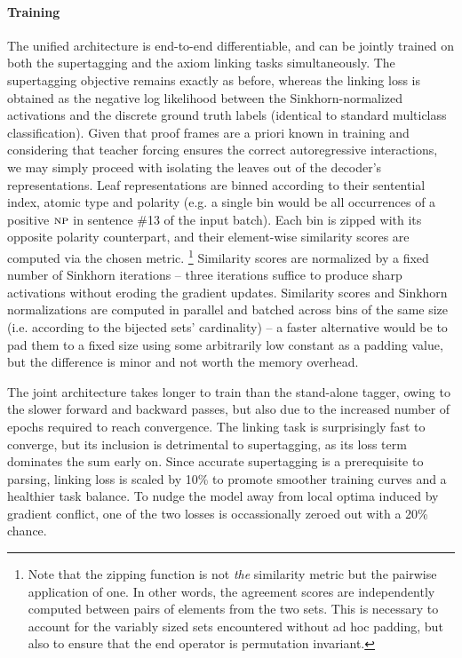 \paragraph{Training}
The unified architecture is end-to-end differentiable, and can be jointly trained on both the supertagging and the axiom linking tasks simultaneously.
The supertagging objective remains exactly as before, whereas the linking loss is obtained as the negative log likelihood between the Sinkhorn-normalized activations and the discrete ground truth labels (identical to standard multiclass classification).
Given that proof frames are a priori known in training and considering that teacher forcing ensures the correct autoregressive interactions, we may simply proceed with isolating the leaves out of the decoder's representations.
Leaf representations are binned according to their sentential index, atomic type and polarity (e.g. a single bin would be all occurrences of a positive $\np[s]$ in sentence \#13 of the input batch).
Each bin is zipped with its opposite polarity counterpart, and their element-wise similarity scores are computed via the chosen metric.%
	\footnote{Note that the zipping function is not \textit{the} similarity metric but the pairwise application of one. 
	In other words, the agreement scores are independently computed between pairs of elements from the two sets.
	This is necessary to account for the variably sized sets encountered without ad hoc padding, but also to ensure that the end operator is permutation invariant.}
Similarity scores are normalized by a fixed number of Sinkhorn iterations -- three iterations suffice to produce sharp activations without eroding the gradient updates.
Similarity scores and Sinkhorn normalizations are computed in parallel and batched across bins of the same size (i.e. according to the bijected sets' cardinality) -- a faster alternative would be to pad them to a fixed size using some arbitrarily low constant as a padding value, but the difference is minor and not worth the memory overhead. 

The joint architecture takes longer to train than the stand-alone tagger, owing to the slower forward and backward passes, but also due to the increased number of epochs required to reach convergence.
The linking task is surprisingly fast to converge, but its inclusion is detrimental to supertagging, as its loss term dominates the sum early on.
Since accurate supertagging is a prerequisite to parsing, linking loss is scaled by 10\% to promote smoother training curves and a healthier task balance.
To nudge the model away from local optima induced by gradient conflict, one of the two losses is occassionally zeroed out with a 20\% chance.

